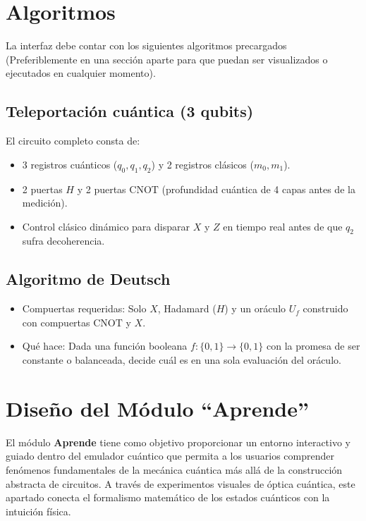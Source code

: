 \documentclass{article}
\begin{document}
\section{Algoritmos}
La interfaz debe contar con los siguientes algoritmos precargados (Preferiblemente en una sección aparte para que puedan ser visualizados o ejecutados en cualquier momento).
\subsection{Teleportación cuántica (3 qubits)}
    El circuito completo consta de:
    \begin{itemize}
        \item 3 registros cuánticos ($q_0, q_1, q_2$) y 2 registros clásicos ($m_0, m_1$).
        \item 2 puertas $H$ y 2 puertas $\text{CNOT}$ (profundidad cuántica de 4 capas antes de la medición).
        \item Control clásico dinámico para disparar $X$ y $Z$ en tiempo real antes de que $q_2$ sufra decoherencia.
    \end{itemize}
    
\subsection{Algoritmo de Deutsch}
    \begin{itemize}
        \item Compuertas requeridas: Solo $X$, Hadamard ($H$) y un oráculo $U_f$ construido con compuertas $\mathrm{CNOT}$ y $X$.
        \item Qué hace: Dada una función booleana $f: \{0,1\} \to \{0,1\}$ con la promesa de ser constante o balanceada, decide cuál es en una sola evaluación del oráculo.
    \end{itemize}

    \section{Diseño del Módulo ``Aprende''}

El módulo \textbf{Aprende} tiene como objetivo proporcionar un entorno interactivo y guiado dentro del emulador cuántico que permita a los usuarios comprender fenómenos fundamentales de la mecánica cuántica más allá de la construcción abstracta de circuitos. A través de experimentos visuales de óptica cuántica, este apartado conecta el formalismo matemático de los estados cuánticos con la intuición física.
\end{document}
